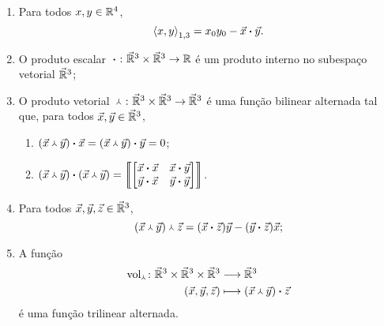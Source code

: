 \begin{exercise}
	\begin{enumerate}
	\item Para todos $x,y \in \mathbb{R}^4$,
		\begin{equation*}
		\left\langle{x},{y}\right\rangle_{1,3} = {x}_0{y}_0-{\vec{x}} \bm{\cdot} {\vec{y}}.
		\end{equation*}

	\item O produto escalar ${} \bm{\cdot} {}\colon \vec{\mathbb{R}}^3 \times \vec{\mathbb{R}}^3 \to \mathbb{R}$ é um produto interno no subespaço vetorial $\vec{\mathbb{R}}^3$;

	\item O produto vetorial ${} \Yup {}\colon \vec{\mathbb{R}}^3 \times \vec{\mathbb{R}}^3 \to \vec{\mathbb{R}}^3$ é uma função bilinear alternada tal que, para todos $\vec{x},\vec{y} \in \vec{\mathbb{R}}^3$,
		\begin{enumerate}
		\item ${({\vec{x}} \Yup {\vec{y}})} \bm{\cdot} {\vec{x}} = {({\vec{x}} \Yup {\vec{y}})} \bm{\cdot} {\vec{y}} = 0$;

		\item ${({\vec{x}} \Yup {\vec{y}})} \bm{\cdot} {({\vec{x}} \Yup {\vec{y}})} =
				\left\llbracket{
					\begin{bmatrix}
					{\vec{x}} \bm{\cdot} {\vec{x}} & {\vec{x}} \bm{\cdot} {\vec{y}} \\
					{\vec{y}} \bm{\cdot} {\vec{x}} & {\vec{y}} \bm{\cdot} {\vec{y}}
					\end{bmatrix}
				}\right\rrbracket$.
		\end{enumerate}

	\item Para todos $\vec{x},\vec{y},\vec{z} \in \vec{\mathbb{R}}^3$,
		\begin{equation*}
		{({\vec{x}} \Yup {\vec{y}})} \Yup {\vec{z}} = ({\vec{x}} \bm{\cdot} {\vec{z}})\vec{y} - ({\vec{y}} \bm{\cdot} {\vec{z}})\vec{x};
		\end{equation*}

	\item A função
		\begin{align*}
		{\operatorname{vol}_{\Yup}}\colon {\vec{\mathbb{R}}^3 \times \vec{\mathbb{R}}^3 \times \vec{\mathbb{R}}^3} &\longrightarrow {\vec{\mathbb{R}}^3} \\{(\vec{x},\vec{y},\vec{z})} &\longmapsto {({\vec{x}} \Yup {\vec{y}})} \bm{\cdot} {\vec{z}}
		\end{align*}
é uma função trilinear alternada.

	\end{enumerate}
\end{exercise}


